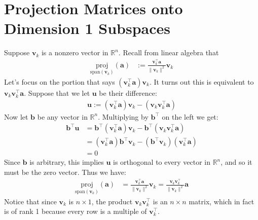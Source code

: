 \documentclass[12pt, a4paper]{article}
\theoremstyle{definition}
\begin{document}
	\section*{Projection Matrices onto Dimension 1 Subspaces}
	Suppose $\mathbf{v}_k$ is a nonzero vector in $\mathbb{R}^n$.
	Recall from linear algebra that
	\begin{align*}
		\underset{\text{span}(\mathbf{v}_k)}{\text{proj}}(\mathbf{a})
		&:=\frac{\mathbf{v}_k^\top \mathbf{a}}{\|\mathbf{v}_k\|^2}\mathbf{v}_k
	\end{align*}
	Let's focus on the portion that says $(\mathbf{v}_k^\top \mathbf{a})\mathbf{v}_k$.
	It turns out this is equivalent to $\mathbf{v}_k\mathbf{v}_k^\top \mathbf{a}$.
	Suppose that we let $\mathbf{u}$ be their difference:
	\begin{align*}
		\mathbf{u} := (\mathbf{v}_k^\top \mathbf{a})\mathbf{v}_k - (\mathbf{v}_k\mathbf{v}_k^\top \mathbf{a})
	\end{align*}
	Now let $\mathbf{b}$ be any vector in $\mathbb{R}^n$. Multiplying by $\mathbf{b}^\top$ on the left
	we get:
	\begin{align*}
		\mathbf{b}^\top \mathbf{u}
		&= \mathbf{b}^\top(\mathbf{v}_k^\top \mathbf{a})\mathbf{v}_k -
		\mathbf{b}^\top(\mathbf{v}_k\mathbf{v}_k^\top \mathbf{a})\\
		&=(\mathbf{v}_k^\top \mathbf{a})\mathbf{b}^\top\mathbf{v}_k
		-(\mathbf{b}^\top\mathbf{v}_k)(\mathbf{v}_k^\top \mathbf{a})
		\tag{Associativity: $A(BC)=(AB)C$}\\
		&=0
	\end{align*}
	Since $\mathbf{b}$ is arbitrary, this implies $\mathbf{u}$ is orthogonal to every vector
	in $\mathbb{R}^n$, and so it must be the zero vector. Thus we have:
	\begin{align}
		\label{eqn:1d-projection}
		\underset{\text{span}(\mathbf{v}_k)}{\text{proj}}(\mathbf{a})
		&=\frac{\mathbf{v}_k^\top \mathbf{a}}{\|\mathbf{v}_k\|^2}\mathbf{v}_k
		=\frac{\mathbf{v}_k\mathbf{v}_k^\top}{\|\mathbf{v}_k\|^2}\mathbf{a}
	\end{align}
	Notice that since $\mathbf{v}_k$ is $n\times 1$, the product $\mathbf{v}_k\mathbf{v}_k^\top$
	is an $n\times n$ matrix, which in fact is of rank 1 because every row is a multiple
	of $\mathbf{v}_k^\top$.
	
\end{document}
